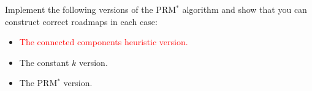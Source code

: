 
Implement the following versions of the PRM$^*$ algorithm and show that you
can construct correct roadmaps in each case:
\begin{itemize}
	\item \textcolor{red}{The connected components heuristic version.}
	\item The constant $k$ version.
	\item The PRM$^*$ version.
\end{itemize}